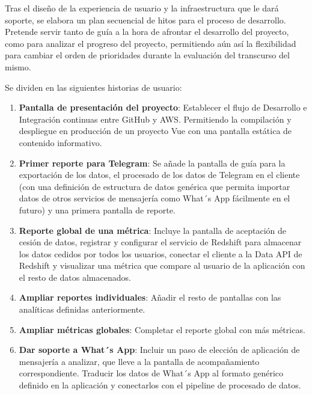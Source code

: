 
Tras el diseño de la experiencia de usuario y la infraestructura que le dará soporte, se elabora un plan secuencial de hitos para el proceso de desarrollo. Pretende servir tanto de guía a la hora de afrontar el desarrollo del proyecto, como para analizar el progreso del proyecto, permitiendo aún así la flexibilidad para cambiar el orden de prioridades durante la evaluación del transcurso del mismo.

Se dividen en las siguientes historias de usuario:

\begin{enumerate}
    \item \textbf{Pantalla de presentación del proyecto}: Establecer el flujo de Desarrollo e Integración continuas entre GitHub y AWS. Permitiendo la compilación y despliegue en producción de un proyecto Vue con una pantalla estática de contenido informativo.
    \item \textbf{Primer reporte para Telegram}: Se añade la pantalla de guía para la exportación de los datos, el procesado de los datos de Telegram en el cliente (con una definición de estructura de datos genérica que permita importar datos de otros servicios de mensajería como What´s App fácilmente en el futuro) y una primera pantalla de reporte.
    \item \textbf{Reporte global de una métrica}: Incluye la pantalla de aceptación de cesión de datos, registrar y configurar el servicio de Redshift para almacenar los datos cedidos por todos los usuarios, conectar el cliente a la Data API de Redshift y visualizar una métrica que compare al usuario de la aplicación con el resto de datos almacenados.
    \item \textbf{Ampliar reportes individuales}: Añadir el resto de pantallas con las analíticas definidas anteriormente.
    \item \textbf{Ampliar métricas globales}: Completar el reporte global con más métricas.
    \item \textbf{Dar soporte a What´s App}: Incluir un paso de elección de aplicación de mensajería a analizar, que lleve a la pantalla de acompañamiento correspondiente. Traducir los datos de What´s App al formato genérico definido en la aplicación y conectarlos con el pipeline de procesado de datos.
\end{enumerate}
